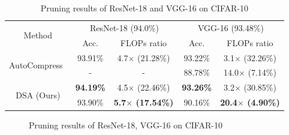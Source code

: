 \documentclass[runningheads]{llncs}
\begin{document}
  \addtolength{\tabcolsep}{1pt}
  \begin{table}[h]
  \caption{Pruning results of ResNet-18 and VGG-16 on CIFAR-10}
  \label{tab:res_cifar10_18}
  \begin{center}
    \begin{tabular}{c@{\hskip 0.02\linewidth}cccc}
      \toprule
  \multirow{2}{*}{Method} & \multicolumn{2}{c}{ResNet-18 (94.0\%)} & \multicolumn{2}{c}{VGG-16 (93.48\%)} \\\cmidrule(lr){2-3}\cmidrule(lr){4-5} 
                          & Acc.            & FLOPs ratio          & Acc.       & FLOPs ratio      \\\midrule
  \multirow{2}{*}{AutoCompress~\cite{autocompress}}      & 93.91\%         & 4.7$\times$ (21.28\%)        & 93.22\%    &
  3.1$\times$ (32.26\%)    \\
    & -       &  -       & 88.78\%   &  14.0$\times$ (7.14\%) \\\cmidrule(lr){1-5} 
  \multirow{2}{*}{DSA (Ours)}               & {\bf 94.19\%}           & 4.5$\times$ (22.46\%)        &  {\bf 93.26\%}    & 3.2$\times$ (30.85\%)             \\
            & 93.90\%          &  {\bf 5.7$\times$ (17.54\%)}     &  90.16\%    &     {\bf 20.4$\times$ (4.90\%)}   \\\bottomrule
  \end{tabular}
  \end{center}
  \end{table}
  \addtolength{\tabcolsep}{-1pt}
  
  \begin{figure}[h]
    \begin{center}
      \caption{Pruning results of ResNet-18, VGG-16 on CIFAR-10}
      \label{fig:results_cifar10_18vgg}
    \end{center}
  \end{figure}
\end{document}
